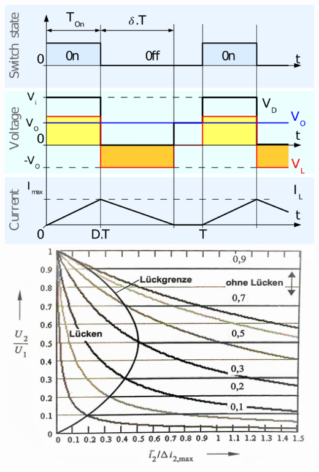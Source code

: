 \begin{minipage}{0.25\linewidth}
    \includegraphics[width=\linewidth]{images/BuckSwitchLueck}
    \includegraphics[width=\linewidth]{images/LueckGrenze}
\end{minipage}
\clearpage

